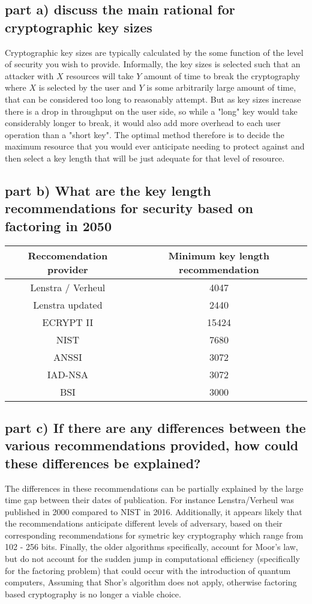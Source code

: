 \documentclass[10pt]{article}
\begin{document}
\subsection*{part a) discuss the main rational for cryptographic key sizes}
Cryptographic key sizes are typically calculated by the some function of the level of security you wish to provide. Informally, the key sizes is selected such that an attacker with $X$ resources will take $Y$ amount of time to break the cryptography where $X$ is selected by the user and $Y$ is some arbitrarily large amount of time, that can be considered too long to reasonably attempt. But as key sizes increase there is a drop in throughput on the user side, so while a "long" key would take considerably longer to break, it would also add more overhead to each user operation than a "short key". The optimal method therefore is to decide the maximum resource that you would ever anticipate needing to protect against and then select a key length that will be just adequate for that level of resource.

\subsection*{part b) What are the key length recommendations for security based on factoring in 2050}
\begin{tabular}{c | c }
{\bf Reccomendation provider} & {\bf Minimum key length recommendation} \\
\hline
Lenstra / Verheul & 4047 \\
Lenstra updated & 2440 \\
ECRYPT II & 15424 \\
NIST & 7680 \\
ANSSI & 3072 \\
IAD-NSA & 3072 \\
BSI & 3000 \\
\end{tabular}

\subsection*{part c) If there are any differences between the various recommendations provided, how could these differences be explained?}
The differences in these recommendations can be partially explained by the large time gap between their dates of publication. For instance Lenstra/Verheul was published in 2000 compared to NIST in 2016. Additionally, it appears likely that the recommendations anticipate different levels of adversary, based on their corresponding recommendations for symetric key cryptography which range from 102 - 256 bits. Finally, the older algorithms specifically, account for Moor's law, but do not account for the sudden jump in computational efficiency (specifically for the factoring problem) that could occur with the introduction of quantum computers, Assuming that Shor's algorithm does not apply, otherwise factoring based cryptography is no longer a viable choice.
\end{document}
